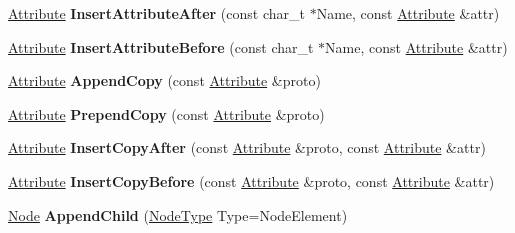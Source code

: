 \begin{DoxyCompactItemize}
\item 
\hypertarget{classphys_1_1xml_1_1Node_a8c4f9fef1db9b6840e966389df238268}{
\hyperlink{classphys_1_1xml_1_1Attribute}{Attribute} {\bfseries InsertAttributeAfter} (const char\_\-t $\ast$Name, const \hyperlink{classphys_1_1xml_1_1Attribute}{Attribute} \&attr)}
\label{d7/d0a/classphys_1_1xml_1_1Node_a8c4f9fef1db9b6840e966389df238268}

\item 
\hypertarget{classphys_1_1xml_1_1Node_a8a9ad7c14e7fdf6a0e7b6e9cdf9e6c31}{
\hyperlink{classphys_1_1xml_1_1Attribute}{Attribute} {\bfseries InsertAttributeBefore} (const char\_\-t $\ast$Name, const \hyperlink{classphys_1_1xml_1_1Attribute}{Attribute} \&attr)}
\label{d7/d0a/classphys_1_1xml_1_1Node_a8a9ad7c14e7fdf6a0e7b6e9cdf9e6c31}

\item 
\hypertarget{classphys_1_1xml_1_1Node_a33de8cdb7ed8694acac79aedc81523c9}{
\hyperlink{classphys_1_1xml_1_1Attribute}{Attribute} {\bfseries AppendCopy} (const \hyperlink{classphys_1_1xml_1_1Attribute}{Attribute} \&proto)}
\label{d7/d0a/classphys_1_1xml_1_1Node_a33de8cdb7ed8694acac79aedc81523c9}

\item 
\hypertarget{classphys_1_1xml_1_1Node_ae5bd358ec34b0c49c6e8caea073bcde6}{
\hyperlink{classphys_1_1xml_1_1Attribute}{Attribute} {\bfseries PrependCopy} (const \hyperlink{classphys_1_1xml_1_1Attribute}{Attribute} \&proto)}
\label{d7/d0a/classphys_1_1xml_1_1Node_ae5bd358ec34b0c49c6e8caea073bcde6}

\item 
\hypertarget{classphys_1_1xml_1_1Node_ae866210535227753bcd02aac8bac9e9e}{
\hyperlink{classphys_1_1xml_1_1Attribute}{Attribute} {\bfseries InsertCopyAfter} (const \hyperlink{classphys_1_1xml_1_1Attribute}{Attribute} \&proto, const \hyperlink{classphys_1_1xml_1_1Attribute}{Attribute} \&attr)}
\label{d7/d0a/classphys_1_1xml_1_1Node_ae866210535227753bcd02aac8bac9e9e}

\item 
\hypertarget{classphys_1_1xml_1_1Node_a1cbb3337abf66ad3e94602fd5c12c00e}{
\hyperlink{classphys_1_1xml_1_1Attribute}{Attribute} {\bfseries InsertCopyBefore} (const \hyperlink{classphys_1_1xml_1_1Attribute}{Attribute} \&proto, const \hyperlink{classphys_1_1xml_1_1Attribute}{Attribute} \&attr)}
\label{d7/d0a/classphys_1_1xml_1_1Node_a1cbb3337abf66ad3e94602fd5c12c00e}

\item 
\hypertarget{classphys_1_1xml_1_1Node_aef276a1af2f747e56072173c18e8382d}{
\hyperlink{classphys_1_1xml_1_1Node}{Node} {\bfseries AppendChild} (\hyperlink{namespacephys_1_1xml_a668b0cc666a9d49f7c7222a7552115d3}{NodeType} Type=NodeElement)}
\label{d7/d0a/classphys_1_1xml_1_1Node_aef276a1af2f747e56072173c18e8382d}


\end{DoxyCompactItemize}
